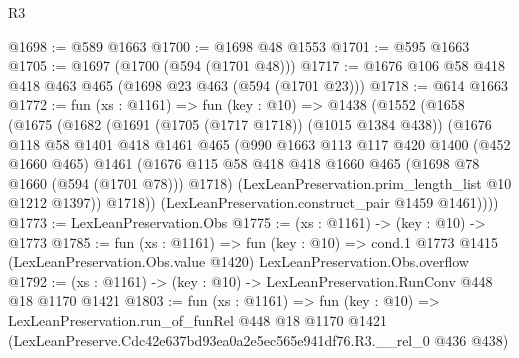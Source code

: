 \begin{lexlean}{R3}
\begin{coremodule}
@1698 := @589 @1663
@1700 := @1698 @48 @1553
@1701 := @595 @1663
@1705 := @1697 (@1700 (@594 (@1701 @48)))
@1717 := @1676 @106 @58 @418 @418 @463 @465 (@1698 @23 @463 (@594 (@1701 @23)))
@1718 := @614 @1663
@1772 := fun (xs : @1161) =>
  fun (key : @10) =>
  @1438
    (@1552
      (@1658
        (@1675
          (@1682
            (@1691 (@1705 (@1717 @1718)) (@1015 @1384 @438))
            (@1676
              @118
              @58
              @1401
              @418
              @1461
              @465
              (@990
                @1663
                @113
                @117
                @420
                @1400
                (@452 @1660 @465)
                @1461
                (@1676 @115 @58 @418 @418 @1660 @465 (@1698 @78 @1660 (@594 (@1701 @78))) @1718)
                (LexLeanPreservation.prim_length_list @10 @1212 @1397))
              @1718))
          (LexLeanPreservation.construct_pair @1459 @1461))))
@1773 := LexLeanPreservation.Obs
@1775 := (xs : @1161) -> (key : @10) -> @1773
@1785 := fun (xs : @1161) =>
  fun (key : @10) =>
  cond.{1} @1773 @1415 (LexLeanPreservation.Obs.value @1420) LexLeanPreservation.Obs.overflow
@1792 := (xs : @1161) -> (key : @10) -> LexLeanPreservation.RunConv @448 @18 @1170 @1421
@1803 := fun (xs : @1161) =>
  fun (key : @10) =>
  LexLeanPreservation.run_of_funRel
    @448
    @18
    @1170
    @1421
    (LexLeanPreserve.Cdc42e637bd93ea0a2e5ec565e941df76.R3.__rel_0 @436 @438)
\end{coremodule}
\end{lexlean}
